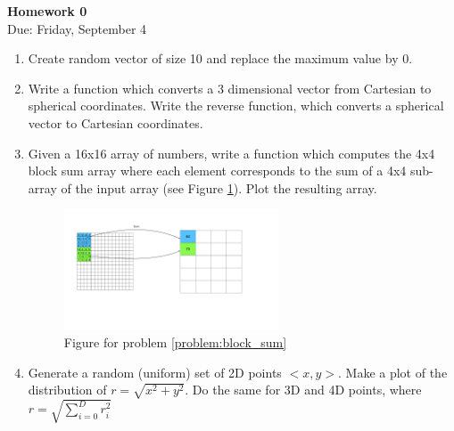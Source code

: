 \documentclass{article}
\begin{document}
\fancyfoot[C]{\thepage}
\vspace*{0cm}
\begin{center}
	{\LARGE \textbf{Homework 0}}\\
	\vspace{0.25cm}
	{\Large Due: Friday, September 4}
\end{center}

\begin{enumerate}
	\item Create random vector of size 10 and replace the maximum value by 0.
	\item Write a function which converts a 3 dimensional vector from Cartesian to spherical coordinates. Write the reverse function, which converts a spherical vector to Cartesian coordinates.
	\item\label{problem:block_sum} Given a 16x16 array of numbers, write a function which computes the 4x4 block sum array where each element corresponds to the sum of a 4x4 sub-array of the input array (see Figure \ref{block_sum}). Plot the resulting array.
	\begin{figure}[ht!]
		\centering
		\includegraphics[width=0.6\textwidth]{block_sum}
		\caption{Figure for problem \ref{problem:block_sum}}
		\label{block_sum}
	\end{figure}

	\item Generate a random (uniform) set of 2D points $<x,y>$. Make a plot of the distribution of $r=\sqrt{x^2+y^2}$. Do the same for 3D and 4D points, where $r=\sqrt{\sum_{i=0}^D r_i^2}$
	

\end{enumerate}
\end{document}
